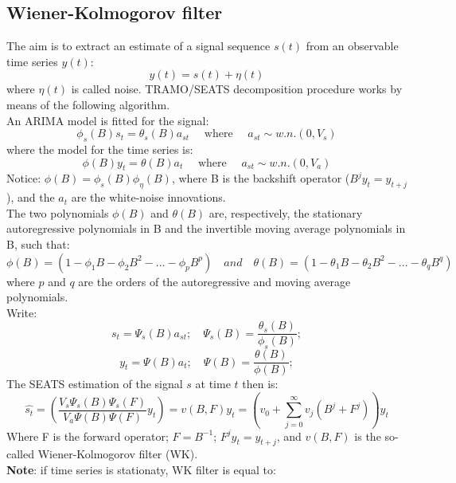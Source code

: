 \documentclass[english,blauw]{cbsdiscussionpaper}
\begin{document}
 \subsection*{Wiener-Kolmogorov filter}
The aim is to extract an estimate of a signal sequence $s(t)$ from an observable time series $y(t)$:
 \begin{equation*}
 y(t)=s(t)+\eta(t)
 \end{equation*}
where $\eta(t)$ is called noise. TRAMO/SEATS decomposition procedure works by means of the following algorithm.\\
An ARIMA model is fitted for the signal:
\begin{equation*}
\phi_{s}(B)s_{t}=\theta_{s}(B)a_{st} \quad \mbox{~where~} \quad a_{st} \sim w.n.(0,V_{s})
\end{equation*}
where the model for the time series is:
\begin{equation*}
\phi(B)y_{t}=\theta(B)a_{t} \quad \mbox{~where~} \quad a_{st}\sim w.n.(0,V_{a})
\end{equation*}
Notice: $\phi(B)=\phi_{s}(B)\phi_{\eta}(B)$, where B is the backshift operator ($B^j y_t=y_{t+j}$), and the $a_t$ are the white-noise innovations.\\The two polynomials $\phi(B)$ and $\theta(B)$ are, respectively, the stationary autoregressive polynomials in B and the invertible moving average polynomials in B, such that: 
\begin{equation*}
\phi(B)=(1-\phi_1 B-\phi_2 B^2-...-\phi_p B^p) \quad and \quad \theta(B)=(1-\theta_1 B-\theta_2 B^2-...-\theta_q B^q)
\end{equation*}
where $p$ and $q$ are the orders of the autoregressive and moving average polynomials.\\
Write:
\begin{equation*}
s_{t}=\Psi_{s}(B)a_{st}; \quad \Psi_{s}(B)=\frac{\theta_{s}(B)}{\phi_{s}(B)} ;
\end{equation*}
\begin{equation*}
y_{t}=\Psi(B)a_{t}; \quad \Psi(B)=\frac{\theta(B)}{\phi(B)} ;
\end{equation*}
The SEATS estimation of the signal $s$ at time $t$ then is:
\begin{equation*}
\hat{s_{t}}=\left ( \frac {V_{s}\Psi_{s}(B)\Psi_{s}(F)}{V_{a}\Psi(B)\Psi(F)} y_{t}\right )=v(B,F)y_{t}=\left ( v_{0}+\sum\limits_{j=0}^\infty  v_{j} (B^{j}+F^{j}) \right) y_{t}
\end{equation*}
Where F is the forward operator; $F=B^{-1}$; $F^{j}y_{t}=y_{t+j}$, and $v(B,F)$ is the so-called Wiener-Kolmogorov filter (WK).\\\textbf{Note}: if time series is stationaty, WK filter is equal to:
\end{document}
